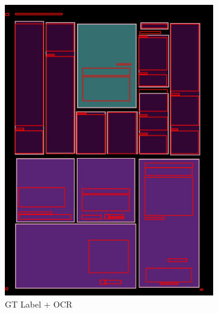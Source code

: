 \documentclass[aspectratio=1610]{beamer}
\begin{document}
\begin{frame}
\begin{figure}
\begin{subfigure}{.25\textwidth}
  \includegraphics[width=0.99\linewidth, clip=true, trim = 0mm 0mm 0mm 0mm]{figures/ocr_bbox/kvtooQ3.jpg}
  \caption{GT Label + OCR}
\end{subfigure}%
\begin{subfigure}{.25\textwidth}
  \centering

\end{subfigure}
\end{figure}
\end{frame}
\end{document}
